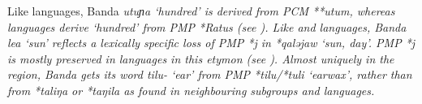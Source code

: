 Like  languages, Banda \it{utuɲa} ‘hundred’
is derived from PCM **utum,
whereas  languages derive ‘hundred’
from PMP *Ratus (see ).
Like  and  languages, Banda \it{lea}
‘sun’ reflects a lexically specific loss of PMP *j in *qaləjaw ‘sun, day’.
PMP *j is mostly preserved in  languages
in this etymon (see ).
Almost uniquely in the region,
Banda gets its word \it{tilu-} ‘ear’ from PMP *tilu/*tuli ‘earwax’,
rather than from *taliŋa or *taŋila as found
in neighbouring subgroups and languages.






